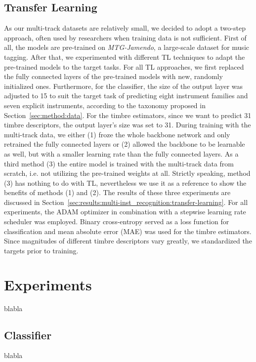 \documentclass{article}
\begin{document}
\subsection{Transfer Learning}
\label{sec:method:training}
As our multi-track datasets are relatively small, we decided to adopt a two-step approach, often used by researchers when training data is not sufficient. First of all, the models are pre-trained on \textit{MTG-Jamendo}, a large-scale dataset for music tagging. After that, we experimented with different TL techniques to adapt the pre-trained models to the target tasks. For all TL approaches, we first replaced the fully connected layers of the pre-trained models with new, randomly initialized ones. Furthermore, for the classifier, the size of the output layer was adjusted to 15 to suit the target task of predicting eight instrument families and seven explicit instruments, according to the taxonomy proposed in Section~\ref{sec:method:data}. For the timbre estimators, since we want to predict 31 timbre descriptors, the output layer's size was set to 31. During training with the multi-track data, we either (1) froze the whole backbone network and only retrained the fully connected layers or (2) allowed the backbone to be learnable as well, but with a smaller learning rate than the fully connected layers. As a third method (3) the entire model is trained with the multi-track data from scratch, i.e. not utilizing the pre-trained weights at all. Strictly speaking, method (3) has nothing to do with TL, nevertheless we use it as a reference to show the benefits of methods (1) and (2). The results of these three experiments are discussed in Section~\ref{sec:results:multi-inst_recognition:transfer-learning}. For all experiments, the ADAM optimizer in combination with a stepwise learning rate scheduler was employed. Binary cross-entropy served as a loss function for classification and mean absolute error (MAE) was used for the timbre estimators. Since magnitudes of different timbre descriptors vary greatly, we standardized the targets prior to training.

\section{Experiments}
\label{sec:experiments}
blabla

\subsection{Classifier}
\label{sec:experiments:classifier}
blabla
\end{document}
